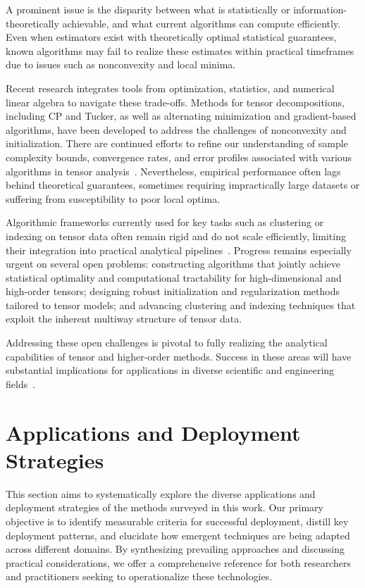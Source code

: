 \documentclass[sigconf]{acmart}
\begin{document}
A prominent issue is the disparity between what is statistically or information-theoretically achievable, and what current algorithms can compute efficiently. Even when estimators exist with theoretically optimal statistical guarantees, known algorithms may fail to realize these estimates within practical timeframes due to issues such as nonconvexity and local minima.

Recent research integrates tools from optimization, statistics, and numerical linear algebra to navigate these trade-offs. Methods for tensor decompositions, including CP and Tucker, as well as alternating minimization and gradient-based algorithms, have been developed to address the challenges of nonconvexity and initialization. There are continued efforts to refine our understanding of sample complexity bounds, convergence rates, and error profiles associated with various algorithms in tensor analysis~\cite{ref104}. Nevertheless, empirical performance often lags behind theoretical guarantees, sometimes requiring impractically large datasets or suffering from susceptibility to poor local optima.

Algorithmic frameworks currently used for key tasks such as clustering or indexing on tensor data often remain rigid and do not scale efficiently, limiting their integration into practical analytical pipelines~\cite{ref104}. Progress remains especially urgent on several open problems: constructing algorithms that jointly achieve statistical optimality and computational tractability for high-dimensional and high-order tensors; designing robust initialization and regularization methods tailored to tensor models; and advancing clustering and indexing techniques that exploit the inherent multiway structure of tensor data.

Addressing these open challenges is pivotal to fully realizing the analytical capabilities of tensor and higher-order methods. Success in these areas will have substantial implications for applications in diverse scientific and engineering fields~\cite{ref104}.

\section{Applications and Deployment Strategies}

This section aims to systematically explore the diverse applications and deployment strategies of the methods surveyed in this work. Our primary objective is to identify measurable criteria for successful deployment, distill key deployment patterns, and elucidate how emergent techniques are being adapted across different domains. By synthesizing prevailing approaches and discussing practical considerations, we offer a comprehensive reference for both researchers and practitioners seeking to operationalize these technologies.
\end{document}
